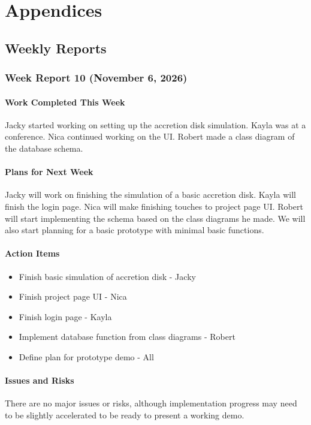 \part{Appendices}
\chapter{Weekly Reports}
\label{Weekly Reports}

\section{Week Report 10 (November 6, 2026)}
\subsection{Work Completed This Week}
Jacky started working on setting up the accretion disk simulation. Kayla was at a conference. Nica continued working on the UI. Robert made a class diagram of the database schema.
\subsection{Plans for Next Week}
Jacky will work on finishing the simulation of a basic accretion disk. Kayla will finish the login page. Nica will make finishing touches to project page UI. Robert will start implementing the schema based on the class diagrams he made. We will also start planning for a basic prototype with minimal basic functions.
\subsection{Action Items}
\begin{itemize}
    \item Finish basic simulation of accretion disk - Jacky
    \item Finish project page UI - Nica
    \item Finish login page - Kayla
    \item Implement database function from class diagrams - Robert
    \item Define plan for prototype demo - All
\end{itemize}

\subsection{Issues and Risks}
There are no major issues or risks, although implementation progress may need to be slightly accelerated to be ready to present a working demo.

